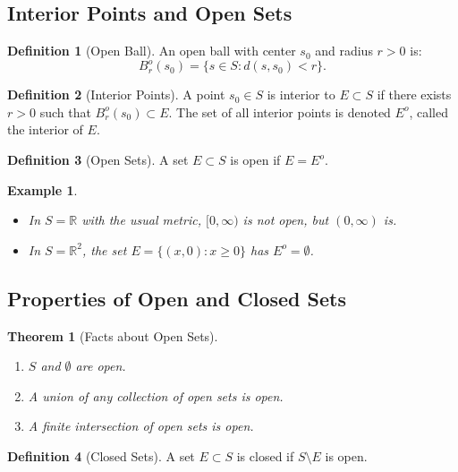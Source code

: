 \documentclass[9pt]{article}
\theoremstyle{definition}
\newtheorem{definition}{Definition}
\theoremstyle{plain}
\newtheorem{theorem}{Theorem}
\newtheorem{example}{Example}
\begin{document}
\subsection*{Interior Points and Open Sets}
\begin{definition}[Open Ball]
An open ball with center \( s_0 \) and radius \( r > 0 \) is:
\[
B_r^o(s_0) = \{s \in S : d(s, s_0) < r\}.
\]
\end{definition}

\begin{definition}[Interior Points]
A point \( s_0 \in S \) is interior to \( E \subset S \) if there exists \( r > 0 \) such that \( B_r^o(s_0) \subset E \). The set of all interior points is denoted \( E^o \), called the interior of \( E \).
\end{definition}

\begin{definition}[Open Sets]
A set \( E \subset S \) is open if \( E = E^o \).
\end{definition}

\begin{example}
\leavevmode
\begin{itemize}
    \item In \( S = \mathbb{R} \) with the usual metric, \( [0, \infty) \) is not open, but \( (0, \infty) \) is.
    \item In \( S = \mathbb{R}^2 \), the set \( E = \{(x, 0) : x \geq 0\} \) has \( E^o = \emptyset \).
\end{itemize}
\end{example}

\subsection*{Properties of Open and Closed Sets}
\begin{theorem}[Facts about Open Sets]
\leavevmode
\begin{enumerate}
    \item \( S \) and \( \emptyset \) are open.
    \item A union of any collection of open sets is open.
    \item A finite intersection of open sets is open.
\end{enumerate}
\end{theorem}

\begin{definition}[Closed Sets]
A set \( E \subset S \) is closed if \( S \setminus E \) is open.
\end{definition}
\end{document}

